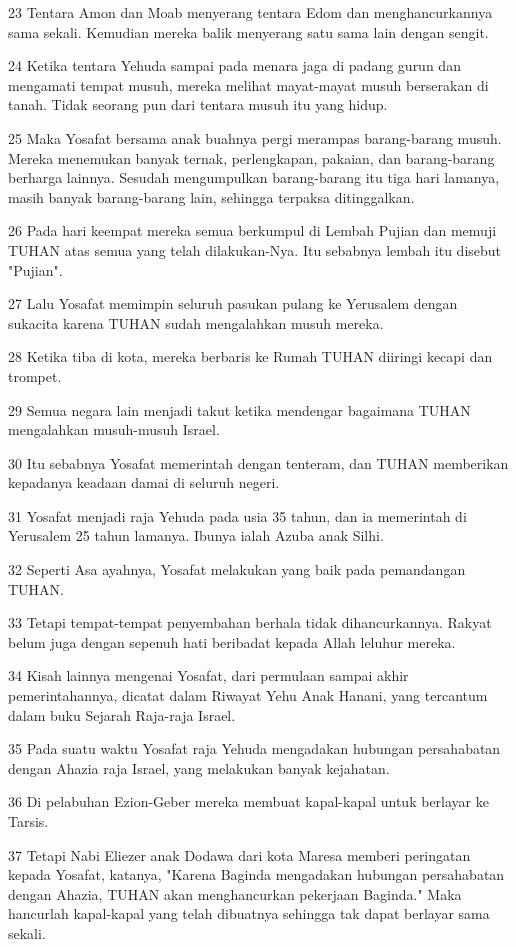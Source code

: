 \par 23 Tentara Amon dan Moab menyerang tentara Edom dan menghancurkannya sama sekali. Kemudian mereka balik menyerang satu sama lain dengan sengit.
\par 24 Ketika tentara Yehuda sampai pada menara jaga di padang gurun dan mengamati tempat musuh, mereka melihat mayat-mayat musuh berserakan di tanah. Tidak seorang pun dari tentara musuh itu yang hidup.
\par 25 Maka Yosafat bersama anak buahnya pergi merampas barang-barang musuh. Mereka menemukan banyak ternak, perlengkapan, pakaian, dan barang-barang berharga lainnya. Sesudah mengumpulkan barang-barang itu tiga hari lamanya, masih banyak barang-barang lain, sehingga terpaksa ditinggalkan.
\par 26 Pada hari keempat mereka semua berkumpul di Lembah Pujian dan memuji TUHAN atas semua yang telah dilakukan-Nya. Itu sebabnya lembah itu disebut "Pujian".
\par 27 Lalu Yosafat memimpin seluruh pasukan pulang ke Yerusalem dengan sukacita karena TUHAN sudah mengalahkan musuh mereka.
\par 28 Ketika tiba di kota, mereka berbaris ke Rumah TUHAN diiringi kecapi dan trompet.
\par 29 Semua negara lain menjadi takut ketika mendengar bagaimana TUHAN mengalahkan musuh-musuh Israel.
\par 30 Itu sebabnya Yosafat memerintah dengan tenteram, dan TUHAN memberikan kepadanya keadaan damai di seluruh negeri.
\par 31 Yosafat menjadi raja Yehuda pada usia 35 tahun, dan ia memerintah di Yerusalem 25 tahun lamanya. Ibunya ialah Azuba anak Silhi.
\par 32 Seperti Asa ayahnya, Yosafat melakukan yang baik pada pemandangan TUHAN.
\par 33 Tetapi tempat-tempat penyembahan berhala tidak dihancurkannya. Rakyat belum juga dengan sepenuh hati beribadat kepada Allah leluhur mereka.
\par 34 Kisah lainnya mengenai Yosafat, dari permulaan sampai akhir pemerintahannya, dicatat dalam Riwayat Yehu Anak Hanani, yang tercantum dalam buku Sejarah Raja-raja Israel.
\par 35 Pada suatu waktu Yosafat raja Yehuda mengadakan hubungan persahabatan dengan Ahazia raja Israel, yang melakukan banyak kejahatan.
\par 36 Di pelabuhan Ezion-Geber mereka membuat kapal-kapal untuk berlayar ke Tarsis.
\par 37 Tetapi Nabi Eliezer anak Dodawa dari kota Maresa memberi peringatan kepada Yosafat, katanya, "Karena Baginda mengadakan hubungan persahabatan dengan Ahazia, TUHAN akan menghancurkan pekerjaan Baginda." Maka hancurlah kapal-kapal yang telah dibuatnya sehingga tak dapat berlayar sama sekali.

